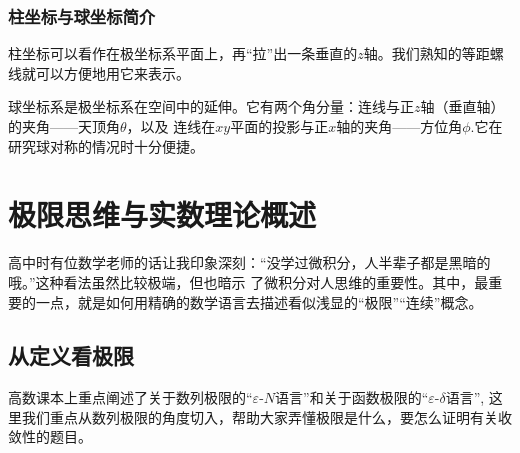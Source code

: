\begin{center}
    \quad
\end{center}

\subsubsection{柱坐标与球坐标简介}
柱坐标可以看作在极坐标系平面上，再“拉”出一条垂直的$z$轴。我们熟知的等距螺线就可以方便地用它来表示。

球坐标系是极坐标系在空间中的延伸。它有两个角分量：连线与正$z$轴（垂直轴）的夹角——天顶角$\theta$，以及
连线在$xy$平面的投影与正$x$轴的夹角——方位角$\phi$.它在研究球对称的情况时十分便捷。
\section{极限思维与实数理论概述}
高中时有位数学老师的话让我印象深刻：“没学过微积分，人半辈子都是黑暗的哦。”这种看法虽然比较极端，但也暗示
了微积分对人思维的重要性。其中，最重要的一点，就是如何用精确的数学语言去描述看似浅显的“极限”“连续”概念。

\subsection{从定义看极限}
高数课本上重点阐述了关于数列极限的“$\varepsilon  \text{-} N$语言”和关于函数极限的“$\varepsilon  \text{-} \delta$语言”,
这里我们重点从数列极限的角度切入，帮助大家弄懂极限是什么，要怎么证明有关收敛性的题目。


